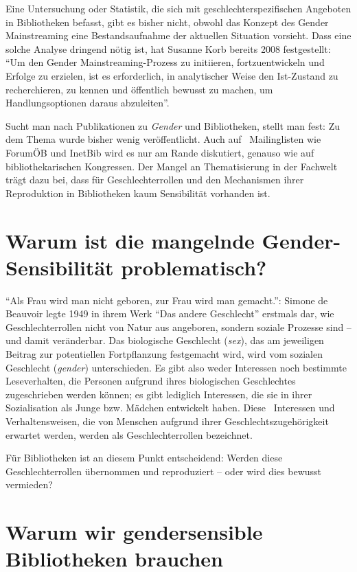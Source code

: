 \documentclass[a4paper,
fontsize=11pt,
oneside,
numbers=noperiodatend,
parskip=half-,
bibliography=totoc,
final
]{scrartcl}
\begin{document}
Eine Untersuchung oder Statistik, die sich mit geschlechterspezifischen
Angeboten in Bibliotheken befasst, gibt es bisher nicht, obwohl das
Konzept des Gender Mainstreaming eine Bestandsaufnahme der aktuellen
Situation vorsieht. Dass eine solche Analyse dringend nötig ist, hat
Susanne Korb bereits 2008 festgestellt: \enquote{Um den Gender
Mainstreaming-Prozess zu initiieren, fortzuentwickeln und Erfolge zu
erzielen, ist es erforderlich, in analytischer Weise den Ist-Zustand zu
recherchieren, zu kennen und öffentlich bewusst zu machen, um
Handlungsoptionen daraus abzuleiten}.

Sucht man nach Publikationen zu \emph{Gender} und Bibliotheken, stellt
man fest: Zu dem Thema wurde bisher wenig veröffentlicht. Auch auf~
Mailinglisten wie ForumÖB und InetBib wird es nur am Rande diskutiert,
genauso wie auf bibliothekarischen Kongressen. Der Mangel an
Thematisierung in der Fachwelt trägt dazu bei, dass für
Geschlechterrollen und den Mechanismen ihrer Reproduktion in
Bibliotheken kaum Sensibilität vorhanden ist.

\section*{Warum ist die mangelnde Gender-Sensibilität
problematisch?}\label{warum-ist-die-mangelnde-gender-sensibilituxe4t-problematisch}

\enquote{Als Frau wird man nicht geboren, zur Frau wird man gemacht.}:
Simone de Beauvoir legte 1949 in ihrem Werk \enquote{Das andere
Geschlecht} erstmals dar, wie Geschlechterrollen nicht von Natur aus
angeboren, sondern soziale Prozesse sind -- und damit veränderbar. Das
biologische Geschlecht (\emph{sex}), das am jeweiligen Beitrag zur
potentiellen Fortpflanzung festgemacht wird, wird vom sozialen
Geschlecht (\emph{gender}) unterschieden. Es gibt also weder Interessen
noch bestimmte Leseverhalten, die Personen aufgrund ihres biologischen
Geschlechtes zugeschrieben werden können; es gibt lediglich Interessen,
die sie in ihrer Sozialisation als Junge bzw. Mädchen entwickelt haben.
Diese~ Interessen und Verhaltensweisen, die von Menschen aufgrund ihrer
Geschlechtszugehörigkeit erwartet werden, werden als Geschlechterrollen
bezeichnet.

Für Bibliotheken ist an diesem Punkt entscheidend: Werden diese
Geschlechterrollen übernommen und reproduziert -- oder wird dies bewusst
vermieden?

\section*{Warum wir gendersensible Bibliotheken
brauchen}\label{warum-wir-gendersensible-bibliotheken-brauchen}
\end{document}
